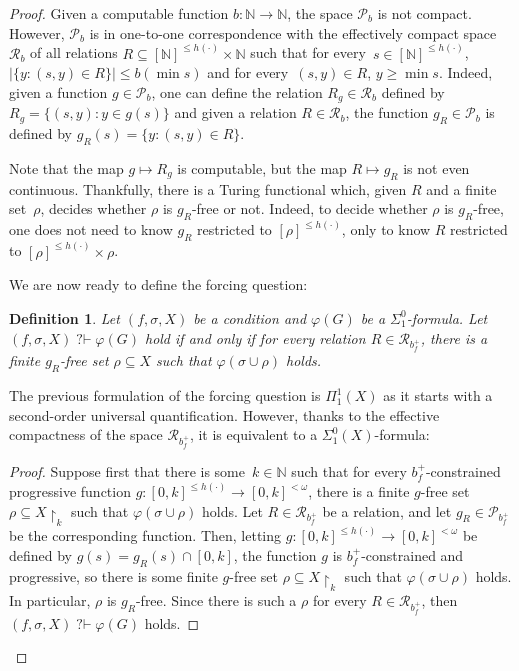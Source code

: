 \documentclass{article}
\def\P{\mathcal{P}}
\newcommand{\uh}{\upharpoonright}
\newcommand{\qvdash}{\operatorname{{?}{\vdash}}}
\newcommand{\NN}[0]{\mathbb{N}}
\numberwithin{theorem}{section}
\newtheorem{lemma}[theorem]{Lemma}
\newtheorem{definition}[theorem]{Definition}
\newcommand{\R}{\mathcal{R}}
\begin{document}
\begin{proof}
Given a computable function $b : \NN \to \NN$, the space $\P_b$ is not compact.
However, $\P_b$ is in one-to-one correspondence with the effectively compact space $\R_b$ of all relations $R \subseteq [\NN]^{\leq h(\cdot)} \times \NN$ such that for every~$s \in [\NN]^{\leq h(\cdot)}$, $|\{ y : (s, y) \in R \}| \leq b(\min s)$ and for every~$(s, y) \in R$, $y \geq \min s$. Indeed, given a function $g \in \P_b$, one can define the relation $R_g \in \R_b$ defined by $R_g = \{ (s, y) : y \in g(s) \}$ and given a relation $R \in \R_b$, the function $g_R \in \P_b$ is defined by $g_R(s) = \{ y : (s, y) \in R \}$.

Note that the map $g \mapsto R_g$ is computable, but the map $R \mapsto g_R$ is not even continuous. Thankfully, there is a Turing functional which, given $R$ and a finite set~$\rho$, decides whether $\rho$ is $g_R$-free or not. Indeed, to decide whether $\rho$ is $g_R$-free, one does not need to know $g_R$ restricted to $[\rho]^{\leq h(\cdot)}$, only to know $R$ restricted to $[\rho]^{\leq h(\cdot)} \times \rho$.

We are now ready to define the forcing question:

\begin{definition}
Let $(f, \sigma, X)$ be a condition and $\varphi(G)$ be a $\Sigma^0_1$-formula.
Let $(f, \sigma, X) \qvdash \varphi(G)$ hold if and only if for every relation $R \in \R_{b_f^{+}}$, there is a finite $g_R$-free set $\rho \subseteq X$ such that $\varphi(\sigma \cup \rho)$ holds.
\end{definition}

The previous formulation of the forcing question is $\Pi^1_1(X)$ as it starts with a second-order universal quantification. However, thanks to the effective compactness of the space $\R_{b_f^{+}}$, it is equivalent to a $\Sigma^0_1(X)$-formula:

\begin{proof}
Suppose first that there is some~$k \in \NN$ such that for every $b_f^{+}$-constrained progressive function $g : [0, k]^{\leq h(\cdot)} \to [0, k]^{<\omega}$, there is a finite $g$-free set $\rho \subseteq X \uh_k$ such that $\varphi(\sigma \cup \rho)$ holds. Let $R \in \R_{b_f^+}$ be a relation,
and let $g_R \in \P_{b_f^+}$ be the corresponding function. Then, letting $g : [0, k]^{\leq h(\cdot)} \to [0, k]^{<\omega}$ be defined by $g(s) = g_R(s) \cap [0, k]$, the function $g$ is $b_f^{+}$-constrained and progressive, so there is some finite $g$-free set $\rho \subseteq X \uh_k$ such that $\varphi(\sigma \cup \rho)$ holds. In particular, $\rho$ is $g_R$-free. Since there is such a $\rho$ for every $R \in \R_{b_f^+}$, then $(f, \sigma, X) \qvdash \varphi(G)$ holds.


\end{proof}
\end{proof}
\end{document}
